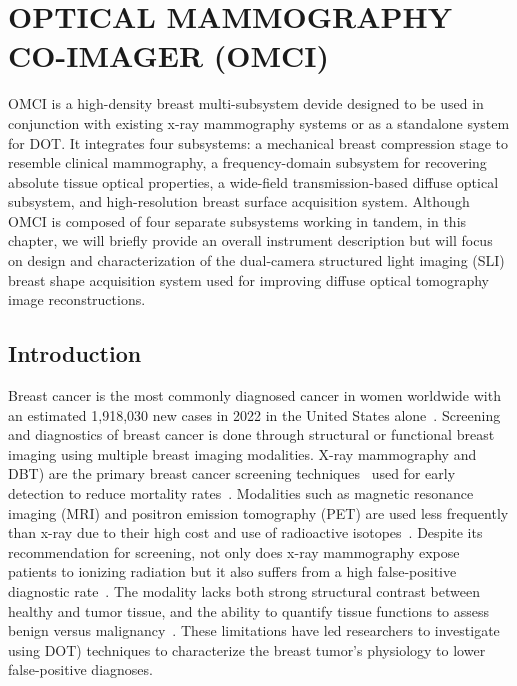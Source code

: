 
\chapter{OPTICAL MAMMOGRAPHY CO-IMAGER (OMCI)} %
\label{chap:omci}
\ac{OMCI} is a high-density breast multi-subsystem devide designed to be used in conjunction with existing x-ray mammography systems or as a standalone system for \ac{DOT}. It integrates four subsystems: a mechanical breast compression stage to resemble clinical mammography, a frequency-domain subsystem for recovering absolute tissue optical properties, a wide-field transmission-based diffuse optical subsystem, and high-resolution breast surface acquisition system. Although \ac{OMCI} is composed of four separate subsystems working in tandem, in this chapter, we will briefly provide an overall instrument description but will focus on design and characterization of the dual-camera structured light imaging (\ac{SLI}) breast shape acquisition system used for improving diffuse optical tomography image reconstructions.


\section{Introduction} %
\label{chap:omci:introduction}
Breast cancer is the most commonly diagnosed cancer in women worldwide with an estimated 1,918,030 new cases in 2022 in the United States alone~\cite{Siegel2022}. Screening and diagnostics of breast cancer is done through structural or functional breast imaging using multiple breast imaging modalities. X-ray mammography and \ac{DBT}) are the primary breast cancer screening techniques~\cite{Secretan2015} used for early detection to reduce mortality rates~\cite{Tabar2003}. Modalities such as magnetic resonance imaging (\ac{MRI}) and positron emission tomography (\ac{PET}) are used less frequently than x-ray due to their high cost and use of radioactive isotopes~\cite{Secretan2015}. Despite its recommendation for screening, not only does x-ray mammography expose patients to ionizing radiation but it also suffers from a high false-positive diagnostic rate~\cite{Tabar2003, Elmore1998}. The modality lacks both strong structural contrast between healthy and tumor tissue, and the ability to quantify tissue functions to assess benign versus malignancy~\cite{Leff2008}. These limitations have led researchers to investigate using \ac{DOT}) techniques to characterize the breast tumor's physiology to lower false-positive diagnoses. 


